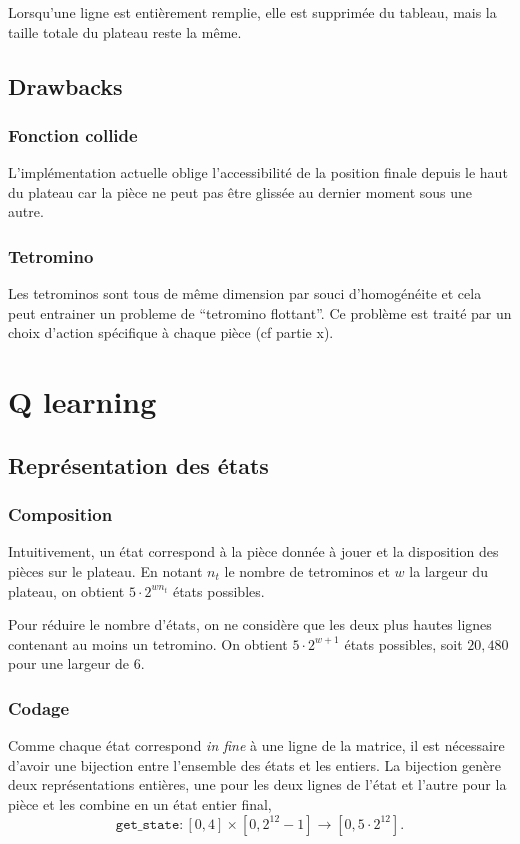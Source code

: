 \documentclass{article}
\begin{document}
Lorsqu'une ligne est entièrement remplie, elle est supprimée du tableau, mais
la taille totale du plateau reste la même.

\subsection{Drawbacks}
\subsubsection{Fonction collide}
L'implémentation actuelle oblige l'accessibilit\'e de la position finale depuis
le haut du plateau car la pi\`ece ne peut pas \^etre gliss\'ee au dernier moment
sous une autre.
\subsubsection{Tetromino}
Les tetrominos sont tous de même dimension par souci d'homogénéite et cela
peut entrainer un probleme de ``tetromino flottant''. Ce problème est traité par
un choix d'action spécifique à chaque pièce (cf partie x).
\section{Q learning}

\subsection{Représentation des états}
\subsubsection{Composition}
Intuitivement, un état correspond à la pièce donnée à jouer et la disposition
des pièces sur le plateau. En notant \(n_t\) le nombre de tetrominos et \(w\) la
largeur du plateau, on obtient \(5 \cdot 2^{wn_t}\) états possibles.

Pour réduire le nombre d'états, on ne considère que les deux plus hautes lignes
contenant au moins un tetromino. On obtient \(5\cdot 2^{w+1}\) états possibles,
soit \(20,480\) pour une largeur de 6.

\subsubsection{Codage}
Comme chaque état correspond \textit{in fine} à une ligne de la matrice, il est
nécessaire d'avoir une bijection entre l'ensemble des états et les entiers. La
bijection genère deux représentations entières, une pour les deux lignes de
l'état et l'autre pour la pièce et les combine en un état entier final,
\[
  \texttt{get\_state}\colon [0,4]\times [0, 2^{12} - 1] \to [0, 5\cdot 2^{12}].
\]
\end{document}
